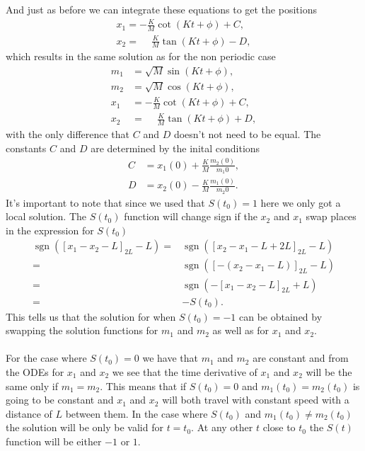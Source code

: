 \documentclass[english,master]{liumaiex}
\theoremstyle{plain}
\theoremstyle{definition}
\DeclareMathOperator{\sgn}{sgn}
\begin{document}
%
And just as before we can integrate these equations to get the positions
\begin{equation}
\begin{aligned}
	x_1 = -\frac{K}{M}\cot(Kt + \phi) + C,\\
	x_2 = \phantom{-}\frac{K}{M}\tan(Kt + \phi) - D,
\end{aligned}
\end{equation}
which results in the same solution as for the non periodic case
\begin{align}
	m_1 &= \sqrt{M} \sin(K t + \phi), \\
	m_2 &= \sqrt{M} \cos(K t + \phi), \\
	x_1 &= -\frac{K}{M}\cot(Kt + \phi) + C,\\
	x_2 &= \phantom{-}\frac{K}{M}\tan(Kt + \phi) + D,
\end{align}
with the only difference that $C$ and $D$ doesn't not need to be equal. The constants $C$ and $D$ are determined by the inital conditions
\begin{equation}
\begin{aligned}
	C &= x_1(0) + \frac{K}{M}\frac{m_2(0)}{m_1{0}}, \\
	D &= x_2(0) - \frac{K}{M}\frac{m_1(0)}{m_2{0}}.
\end{aligned}
\end{equation}
It's important to note that since we used that $S(t_0) = 1$ here we only got a local solution. The $S(t_0)$ function will change sign if the $x_2$ and $x_1$ swap places in the expression for $S(t_0)$
\begin{equation}
\begin{aligned}
	\sgn([x_1 - x_2 - L]_{2L} - L) =& \sgn([x_2 - x_1 - L + 2L]_{2L} - L)  \\
	=& \sgn([-(x_2 - x_1 - L)]_{2L} - L) \\
	=& \sgn(-[x_1 - x_2 - L]_{2L} + L) \\
	=& -S(t_0).
\end{aligned}
\end{equation} 
This tells us that the solution for when $S(t_0) = -1$ can be obtained by swapping the solution functions for $m_1$ and $m_2$ as well as for $x_1$ and $x_2$.
\\ \\
For the case where $S(t_0) = 0$ we have that $m_1$ and $m_2$ are constant and from the ODEs for $x_1$ and $x_2$ we see that the time derivative of $x_1$ and $x_2$ will be the same only if $m_1 = m_2$. This means that if $S(t_0) = 0$ and $m_1(t_0) = m_2(t_0)$ is going to be constant and $x_1$ and $x_2$ will both travel with constant speed with a distance of $L$ between them. In the case where $S(t_0)$ and $m_1(t_0) \neq m_2(t_0)$ the solution will be only be valid for $t = t_0$. At any other $t$ close to $t_0$ the $S(t)$ function will be either $-1$ or $1$.
\end{document}
